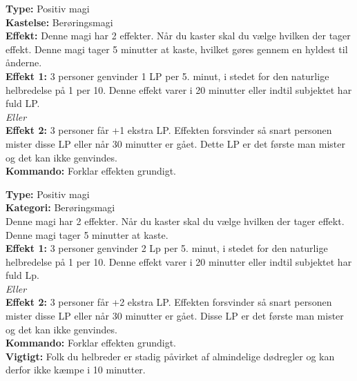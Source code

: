 \begin{åndens gave*}
\textbf{Type:} Positiv magi\\
\textbf{Kastelse:} Berøringsmagi\\
\textbf{Effekt:} Denne magi har 2 effekter. Når du kaster skal du vælge hvilken der tager effekt. Denne magi tager 5 minutter at kaste, hvilket gøres gennem en hyldest til ånderne.\\
\textbf{Effekt 1:} 3 personer genvinder 1 LP per 5. minut, i stedet for den naturlige helbredelse på 1 per 10. Denne effekt varer i 20 minutter eller indtil subjektet har fuld LP.\\
\emph{\textit{Eller}}\\
\textbf{Effekt 2:} 3 personer får +1 ekstra LP. Effekten forsvinder så snart personen mister disse LP eller når 30 minutter er gået. Dette LP er det første man mister og det kan ikke genvindes.\\
\textbf{Kommando:} Forklar effekten grundigt.\\
\end{åndens gave*}

\begin{åndens gave*}
\textbf{Type:} Positiv magi\\
\textbf{Kategori:} Berøringsmagi\\
Denne magi har 2 effekter. Når du kaster skal du vælge hvilken der tager effekt. Denne magi tager 5 minutter at kaste.\\
\textbf{Effekt 1:} 3 personer genvinder 2 Lp per 5. minut, i stedet for den naturlige helbredelse på 1 per 10. Denne effekt varer i 20 minutter eller indtil subjektet har fuld Lp.\\
\emph{\textit{Eller}}\\
\textbf{Effekt 2:} 3 personer får +2 ekstra LP. Effekten forsvinder så snart personen mister disse LP eller når 30 minutter er gået. Disse LP er det første man mister og det kan ikke genvindes.\\
\textbf{Kommando:} Forklar effekten grundigt.\\
\textbf{Vigtigt:} Folk du helbreder er stadig påvirket af almindelige dødregler og kan derfor ikke kæmpe i 10 minutter.
\end{åndens gave*}



